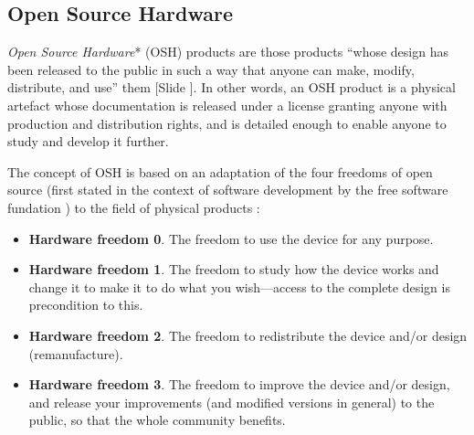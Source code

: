 \documentclass{article}
\newcounter{slide}
\begin{document}
\subsection{Open Source Hardware}
\label{sec:OSH}
\emph{Open Source Hardware}* (OSH) products are those products ``whose design has been released to the public in such a way that anyone can make, modify, distribute, and use'' them \cite{opensourcehardwareassociationOpenSourceHardware2016} {\color{blue}[Slide ]}. In other words, an OSH product is a physical artefact whose documentation is released under a license granting anyone with production and distribution rights, and is detailed enough to enable anyone to study and develop it further. 

The concept of OSH is based on an adaptation of the four freedoms of open source (first stated in the context of software development by the free software fundation \cite{freesoftwarefoundationFreeSoftwareDefinition2015}) to the field of physical products \cite{powellDemocratizingProductionOpen2012}: 
\begin{itemize}
	\item \textbf{Hardware freedom 0}. The freedom to use the device for any purpose.
	\item \textbf{Hardware freedom 1}. The freedom to study how the device works and change it to make it to do what you wish---access to the complete design is precondition to this.
	\item \textbf{Hardware freedom 2}. The freedom to redistribute the device and/or design (remanufacture).
	\item \textbf{Hardware freedom 3}. The freedom to improve the device and/or design, and release your improvements (and modified versions in general) to the public, so that the whole community benefits.
\end{itemize}
\end{document}
